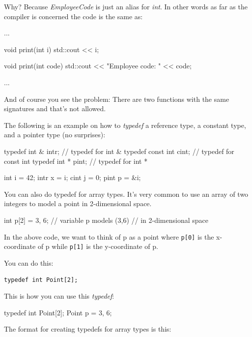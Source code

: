 Why? Because \textit{EmployeeCode} is just an alias for \textit{int}. In
other words as far as the compiler is concerned the code is the same as:

\begin{consolethree}[escapeinside=||]
...

void print(int i)
{
    std::cout << i;
}

void print(int code)
{
    std::cout << "Employee code: " << code;
}

...
\end{consolethree}

And of course you see the problem: There are two functions with the same
signatures and that's not allowed.

The following is an example on how to \textit{typedef} a reference type, a
constant type, and a pointer type (no surprises):

\begin{consolethree}[escapeinside=||]
typedef int & intr;   // typedef for int &
typedef const int cint; // typedef for const int
typedef int * pint;   // typedef for int *

int i = 42;
intr x = i;
cint j = 0;
pint p = &i;
\end{consolethree}



\newpage{}

You can also do typedef for array types. It's very
common to use an array of two integers to model a point in 2-dimensional
space.

\begin{consolethree}[escapeinside=||]
int p[2] = {3, 6}; // variable p models (3,6)
                   // in 2-dimensional space
\end{consolethree}

In the above code, we want to think of p as a point where \verb!p[0]! is
the x-coordinate of p while \verb!p[1]! is the y-coordinate of p.

You can do this:

\verb!typedef int Point[2];!

This is how you can use this \textit{typedef}:

\begin{consolethree}[escapeinside=||]
typedef int Point[2];
Point p = {3, 6};
\end{consolethree}

The format for creating typedefs for array types is this:

